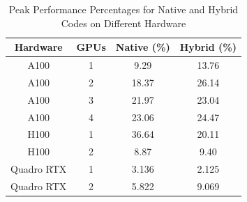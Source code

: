 \begin{table}[htbp]
\centering
\begin{tabular}{|c|c|c|c|}
\hline
\textbf{Hardware} & \textbf{GPUs} & \textbf{Native (\%)} & \textbf{Hybrid (\%)} \\ \hline
A100              & 1             & 9.29                 & 13.76                \\ \hline
A100              & 2             & 18.37                & 26.14                \\ \hline
A100              & 3             & 21.97                & 23.04                \\ \hline
A100              & 4             & 23.06                & 24.47                \\ \hline
H100              & 1             & 36.64                & 20.11                \\ \hline
H100              & 2             & 8.87                 & 9.40                 \\ \hline
Quadro RTX        & 1             & 3.136                & 2.125                \\ \hline
Quadro RTX        & 2             & 5.822                & 9.069                \\ \hline
\end{tabular}
\caption{Peak Performance Percentages for Native and Hybrid Codes on Different Hardware}
\label{tab:ppp}
\end{table}





